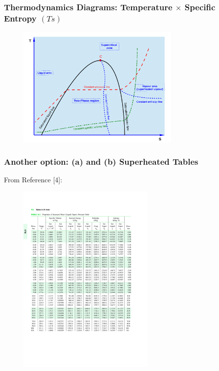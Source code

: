 \documentclass[10pt,compress,handout,unknownkeysallowed]{beamer}
\begin{document}
\begin{frame}
 \frametitle{Thermodynamics Diagrams: Temperature $\times$ Specific Entropy $(Ts)$}
  \begin{center}
   \begin{figure}
      \includegraphics[width=8cm,height=7.cm,clip]{../Pics/TS_Diag_Schematics}
   \end{figure}
   \end{center}
\end{frame}

\begin{frame}
  \frametitle{Another option: (a)  and (b) Superheated Tables}
\scriptsize{From Reference [4]:}\vspace{-.8cm}
   \begin{center}
   \begin{figure}
      \includegraphics[width=9.cm,height=9.5cm,clip]{../Pics/WaterSatTable}
   \end{figure}
   \end{center}
\end{frame}
\end{document}
